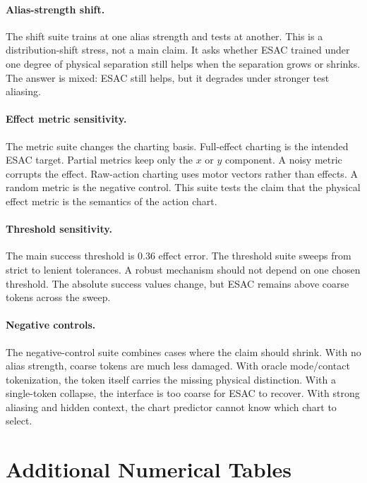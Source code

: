 \documentclass{article}
\begin{document}
\paragraph{Alias-strength shift.}
The shift suite trains at one alias strength and tests at another. This is a
distribution-shift stress, not a main claim. It asks whether ESAC trained under
one degree of physical separation still helps when the separation grows or
shrinks. The answer is mixed: ESAC still helps, but it degrades under stronger
test aliasing.

\paragraph{Effect metric sensitivity.}
The metric suite changes the charting basis. Full-effect charting is the
intended ESAC target. Partial metrics keep only the $x$ or $y$ component. A
noisy metric corrupts the effect. Raw-action charting uses motor vectors rather
than effects. A random metric is the negative control. This suite tests the
claim that the physical effect metric is the semantics of the action chart.

\paragraph{Threshold sensitivity.}
The main success threshold is 0.36 effect error. The threshold suite sweeps from
strict to lenient tolerances. A robust mechanism should not depend on one
chosen threshold. The absolute success values change, but ESAC remains above
coarse tokens across the sweep.

\paragraph{Negative controls.}
The negative-control suite combines cases where the claim should shrink. With
no alias strength, coarse tokens are much less damaged. With oracle mode/contact
tokenization, the token itself carries the missing physical distinction. With a
single-token collapse, the interface is too coarse for ESAC to recover. With
strong aliasing and hidden context, the chart predictor cannot know which chart
to select.

\section{Additional Numerical Tables}
\end{document}
